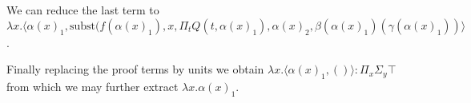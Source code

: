 \documentclass[onehalfspacing]{article}
\begin{document}
\hfill
\\\\\hspace{2cm}We can reduce the last term to $\lambda x.\langle \alpha(x)_1, \text{subst}(f(\alpha(x)_1),x,\Pi_tQ(t, \alpha(x)_1),\alpha(x)_2,\beta(\alpha(x)_1)(\gamma(\alpha(x)_1))\rangle$.

\noindent Finally replacing the proof terms by units we obtain $\lambda x.\langle \alpha(x)_1, ()\rangle : \Pi_x\Sigma_y \top$ from which we may further extract $\lambda x. \alpha(x)_1$.




\pagebreak


\end{document}
